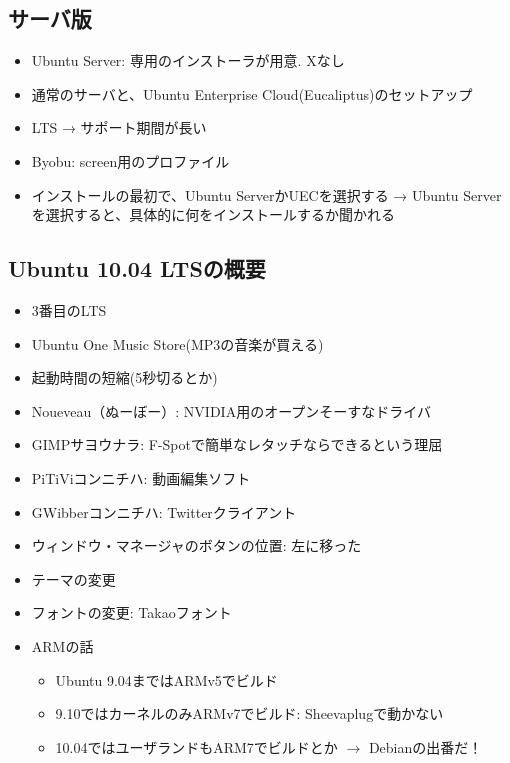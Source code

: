 \documentclass[mingoth,a4paper]{jsarticle}
\begin{document}
\subsection{サーバ版}

\begin{itemize}
      \item Ubuntu Server: 専用のインストーラが用意. Xなし
      \item 通常のサーバと、Ubuntu Enterprise Cloud(Eucaliptus)のセットアップ
      \item LTS → サポート期間が長い
      \item Byobu: screen用のプロファイル
      \item インストールの最初で、Ubuntu ServerかUECを選択する
    →
    Ubuntu Serverを選択すると、具体的に何をインストールするか聞かれる
\end{itemize}

\subsection{Ubuntu 10.04 LTSの概要}
\begin{itemize}
      \item 3番目のLTS
      \item Ubuntu One Music Store(MP3の音楽が買える)
      \item 起動時間の短縮(5秒切るとか)
      \item Noueveau（ぬーぼー）: NVIDIA用のオープンそーすなドライバ
      \item GIMPサヨウナラ: F-Spotで簡単なレタッチならできるという理屈
      \item PiTiViコンニチハ: 動画編集ソフト
      \item GWibberコンニチハ:  Twitterクライアント
      \item ウィンドウ・マネージャのボタンの位置: 左に移った
      \item テーマの変更
      \item フォントの変更: Takaoフォント
      \item ARMの話
    \begin{itemize}
          \item Ubuntu 9.04まではARMv5でビルド
          \item 9.10ではカーネルのみARMv7でビルド: Sheevaplugで動かない
          \item 10.04ではユーザランドもARM7でビルドとか $\rightarrow$ Debianの出番だ！
    \end{itemize}
\end{itemize}
\end{document}
